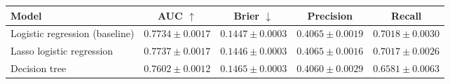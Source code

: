 \begin{tabular}{lcccc}
\toprule
Model & AUC $\uparrow$ & Brier $\downarrow$ & Precision & Recall \\
\midrule
Logistic regression (baseline) & $0.7734 \pm 0.0017$ & $0.1447 \pm 0.0003$ & $0.4065 \pm 0.0019$ & $0.7018 \pm 0.0030$ \\
Lasso logistic regression & $0.7737 \pm 0.0017$ & $0.1446 \pm 0.0003$ & $0.4065 \pm 0.0016$ & $0.7017 \pm 0.0026$ \\
Decision tree & $0.7602 \pm 0.0012$ & $0.1465 \pm 0.0003$ & $0.4060 \pm 0.0029$ & $0.6581 \pm 0.0063$ \\
\bottomrule
\end{tabular}
